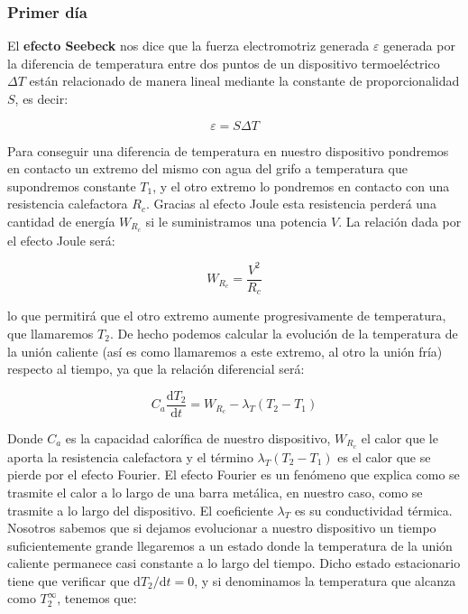 \documentclass[12pt,a4paper]{article}
\newcommand{\D}{\mathrm{d}}
\begin{document}
\subsubsection{Primer día}

El \textbf{efecto Seebeck} nos dice que la fuerza electromotriz generada $\varepsilon$ generada por la diferencia de temperatura entre dos puntos de un dispositivo termoeléctrico $\Delta T$ están relacionado de manera lineal mediante la constante de proporcionalidad $S$, es decir:

\begin{equation}
\varepsilon = S \Delta T
\end{equation}


Para conseguir una diferencia de temperatura en nuestro dispositivo pondremos en contacto un extremo del mismo con agua del grifo a temperatura que supondremos constante $T_1$, y el otro extremo lo pondremos en contacto con una resistencia calefactora $R_c$. Gracias al efecto Joule esta resistencia perderá una cantidad de energía $W_{R_c}$ si le suministramos una potencia $V$. La relación dada por el efecto Joule será:

\begin{equation}
W_{R_c} = \dfrac{V^2}{R_c} \label{Ec:efectoJoule}
\end{equation}

lo que permitirá que el otro extremo aumente progresivamente de temperatura, que llamaremos $T_2$. De hecho podemos calcular la evolución de la temperatura de la unión caliente (así es como llamaremos a este extremo, al otro la unión fría) respecto al tiempo, ya que la relación diferencial será:

\begin{equation}
C_a \dfrac{\D T_2}{\D t} = W_{R_{c}} - \lambda_T (T_2 - T_1)
\label{Ec:temperatura2diferencial}
\end{equation}



Donde $C_a$ es la capacidad calorífica de nuestro dispositivo, $W_{R_c}$ el calor que le aporta la resistencia calefactora y el término $\lambda_T(T_2-T_1)$ es el calor que se pierde por el efecto Fourier. El efecto Fourier es un fenómeno que explica como se trasmite el calor a lo largo de una barra metálica, en nuestro caso, como se trasmite a lo largo del dispositivo. El coeficiente $\lambda_T$ es su conductividad térmica. \\

Nosotros sabemos que si dejamos evolucionar a nuestro dispositivo un tiempo suficientemente grande llegaremos a un estado donde la temperatura de la unión caliente permanece casi constante a lo largo del tiempo. Dicho estado estacionario tiene que verificar que $\D T_2 / \D t = 0$, y si denominamos la temperatura que alcanza como $T_2^{\infty}$, tenemos que:
\end{document}
